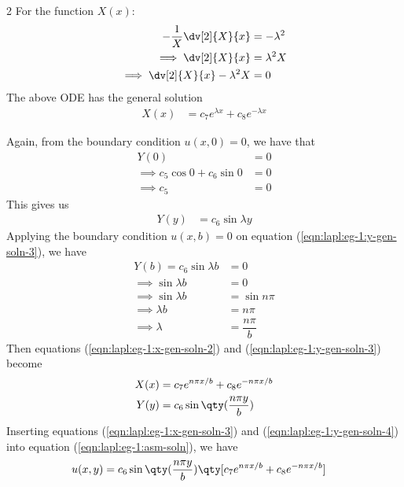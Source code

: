 \begin{enumerate}
\begin{multicols}{2}
                \columnbreak
                For the function $X(x)$:
                \begin{align*}
                    -\dfrac{1}{X}\dv[2]{X}{x}&=-\lambda^2 \\
                    \implies\dv[2]{X}{x}&=\lambda^2X \\
                    \implies\dv[2]{X}{x}-\lambda^2X&=0
                \end{align*}
                The above ODE has the general solution
                \begin{align}
                    X(x)&=c_7e^{\lambda x}+c_8e^{-\lambda x} \label{eqn:lapl:eg-1:x-gen-soln-2}
                \end{align}
                
            \end{multicols}
            Again, from the boundary condition $u(x,0)=0$, we have that
            \begin{align*}
                Y(0)&=0 \\
                \implies c_5\cos{0}+c_6\sin{0}&=0 \\
                \implies c_5&=0
            \end{align*}
            This gives us
            \begin{align}
                Y(y)&=c_6\sin{\lambda y} \label{eqn:lapl:eg-1:y-gen-soln-3}
            \end{align}
            Applying the boundary condition $u(x,b)=0$ on equation (\ref{eqn:lapl:eg-1:y-gen-soln-3}), we have
            \begin{align*}
                Y(b)=c_6\sin{\lambda b}&=0 \\
                \implies \sin{\lambda b}&=0 \\
                \implies \sin{\lambda b}&=\sin{n\pi} \\
                \implies \lambda b&=n\pi \\
                \implies \lambda&=\dfrac{n\pi}{b}
            \end{align*}
            Then equations (\ref{eqn:lapl:eg-1:x-gen-soln-2}) and (\ref{eqn:lapl:eg-1:y-gen-soln-3}) become
            \begin{align}
                X(x)&=c_7e^{n\pi x/b}+c_8e^{-n\pi x/b} \label{eqn:lapl:eg-1:x-gen-soln-3}\\
                Y(y)&=c_6\sin\qty(\dfrac{n\pi y}{b}) \label{eqn:lapl:eg-1:y-gen-soln-4}
            \end{align}
            Inserting equations (\ref{eqn:lapl:eg-1:x-gen-soln-3}) and (\ref{eqn:lapl:eg-1:y-gen-soln-4}) into equation (\ref{eqn:lapl:eg-1:asm-soln}), we have
            \begin{align}
                u(x,y)&=c_6\sin\qty(\dfrac{n\pi y}{b})\qty[c_7e^{n\pi x/b}+c_8e^{-n\pi x/b}] \label{eqn:lapl:eg-1:gen-u-1}
            \end{align}


\end{enumerate}
